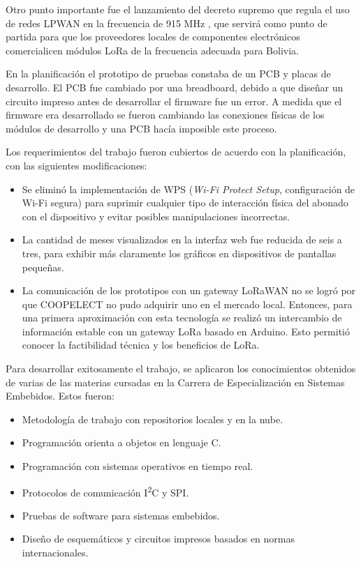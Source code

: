 Otro punto importante fue el lanzamiento del decreto supremo que regula el uso de redes LPWAN en la frecuencia de 915 MHz \citep{WEBSITE:27}, que servirá como punto de partida para que los proveedores locales de componentes electrónicos comercialicen módulos LoRa de la frecuencia adecuada para Bolivia.

En la planificación el prototipo de pruebas constaba de un PCB y placas de desarrollo. El PCB fue cambiado por una breadboard, debido a que diseñar un circuito impreso antes de desarrollar el firmware fue un error. A medida que el firmware era desarrollado se fueron cambiando las conexiones físicas de los módulos de desarrollo y una PCB hacía imposible este proceso.

Los requerimientos del trabajo fueron cubiertos de acuerdo con la planificación, con las siguientes modificaciones:
\begin{itemize}
	\item Se eliminó la implementación de WPS (\textit{Wi-Fi Protect Setup}, configuración de Wi-Fi segura) para suprimir cualquier tipo de interacción física del abonado con el dispositivo y evitar posibles manipulaciones incorrectas.
	\item La cantidad de meses visualizados en la interfaz web fue reducida de seis a tres, para exhibir más claramente los gráficos en dispositivos de pantallas pequeñas.
		\item La comunicación de los prototipos con un gateway LoRaWAN no se logró por que COOPELECT no pudo adquirir uno en el mercado local. Entonces, para una primera aproximación con esta tecnología se realizó un intercambio de información estable con un gateway LoRa basado en Arduino. Esto permitió conocer la factibilidad técnica y los beneficios de LoRa.
\end{itemize}

Para desarrollar exitosamente el trabajo, se aplicaron los conocimientos obtenidos de varias de las materias cursadas en la Carrera de Especialización en Sistemas Embebidos. Estos fueron:

\begin{itemize}
	\item Metodología de trabajo con repositorios locales y en la nube.
	\item Programación orienta a objetos en lenguaje C.
	\item Programación con sistemas operativos en tiempo real.
	\item Protocolos de comunicación I\textsuperscript{2}C y SPI.
	\item Pruebas de software para sistemas embebidos.
	\item Diseño de esquemáticos y circuitos impresos basados en normas internacionales.
\end{itemize}

